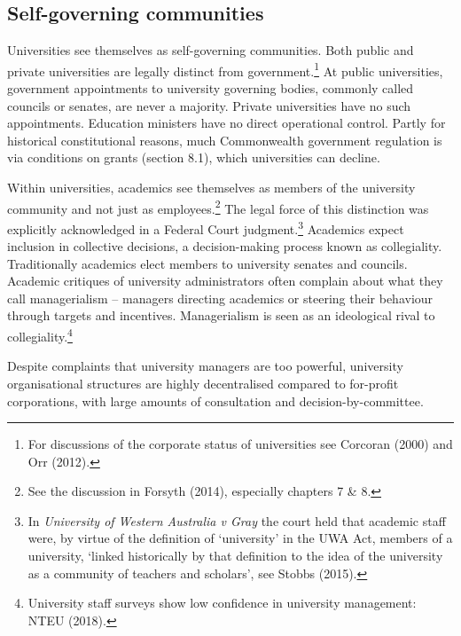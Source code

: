 \documentclass[]{book}
\begin{document}
\hypertarget{self-governing-communities}{%
\subsection{Self-governing communities}\label{self-governing-communities}}

Universities see themselves as self-governing communities. Both public and private universities are legally distinct from government.\footnote{For discussions of the corporate status of universities see Corcoran (2000) and Orr (2012).} At public universities, government appointments to university governing bodies, commonly called councils or senates, are never a majority. Private universities have no such appointments. Education ministers have no direct operational control. Partly for historical constitutional reasons, much Commonwealth government regulation is via conditions on grants (section 8.1), which universities can decline.

Within universities, academics see themselves as members of the university community and not just as employees.\footnote{See the discussion in Forsyth (2014), especially chapters 7 \& 8.} The legal force of this distinction was explicitly acknowledged in a Federal Court judgment.\footnote{In \emph{University of Western Australia v Gray} the court held that academic staff were, by virtue of the definition of `university' in the UWA Act, members of a university, `linked historically by that definition to the idea of the university as a community of teachers and scholars', see Stobbs (2015).} Academics expect inclusion in collective decisions, a decision-making process known as collegiality. Traditionally academics elect members to university senates and councils. Academic critiques of university administrators often complain about what they call managerialism -- managers directing academics or steering their behaviour through targets and incentives. Managerialism is seen as an ideological rival to collegiality.\footnote{University staff surveys show low confidence in university management: NTEU (2018).}

Despite complaints that university managers are too powerful, university organisational structures are highly decentralised compared to for-profit corporations, with large amounts of consultation and decision-by-committee.
\end{document}
